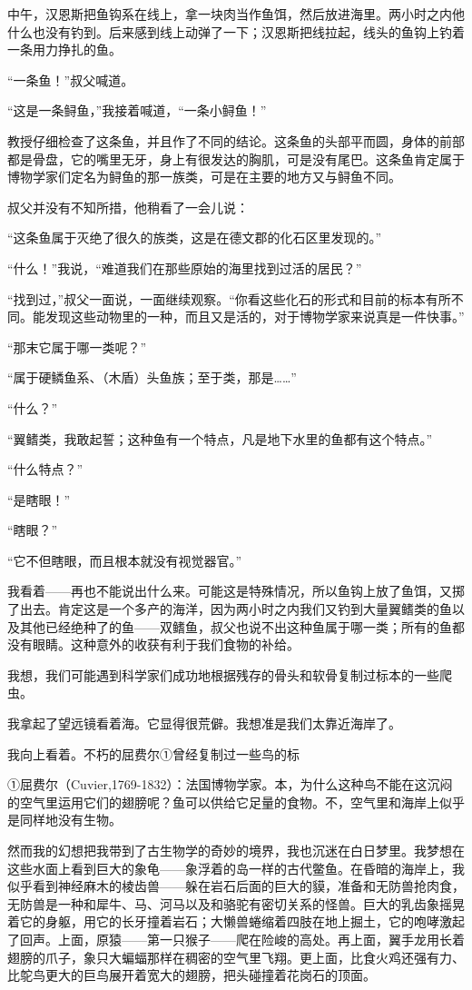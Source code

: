 \documentclass[10pt]{book}
\begin{document}
中午，汉恩斯把鱼钩系在线上，拿一块肉当作鱼饵，然后放进海里。两小时之内他什么也没有钓到。后来感到线上动弹了一下；汉恩斯把线拉起，线头的鱼钩上钓着一条用力挣扎的鱼。

“一条鱼！”叔父喊道。

“这是一条鲟鱼，”我接着喊道，“一条小鲟鱼！”

教授仔细检查了这条鱼，并且作了不同的结论。这条鱼的头部平而圆，身体的前部都是骨盘，它的嘴里无牙，身上有很发达的胸肌，可是没有尾巴。这条鱼肯定属于博物学家们定名为鲟鱼的那一族类，可是在主要的地方又与鲟鱼不同。

叔父并没有不知所措，他稍看了一会儿说：

“这条鱼属于灭绝了很久的族类，这是在德文郡的化石区里发现的。”

“什么！”我说，“难道我们在那些原始的海里找到过活的居民？”

“找到过，”叔父一面说，一面继续观察。“你看这些化石的形式和目前的标本有所不同。能发现这些动物里的一种，而且又是活的，对于博物学家来说真是一件快事。”

“那末它属于哪一类呢？”

“属于硬鳞鱼系、（木盾）头鱼族；至于类，那是……”

“什么？”

“翼鳍类，我敢起誓；这种鱼有一个特点，凡是地下水里的鱼都有这个特点。”

“什么特点？”

“是瞎眼！”

“瞎眼？”

“它不但瞎眼，而且根本就没有视觉器官。”

我看着——再也不能说出什么来。可能这是特殊情况，所以鱼钩上放了鱼饵，又掷了出去。肯定这是一个多产的海洋，因为两小时之内我们又钓到大量翼鳍类的鱼以及其他已经绝种了的鱼——双鳍鱼，叔父也说不出这种鱼属于哪一类；所有的鱼都没有眼睛。这种意外的收获有利于我们食物的补给。

我想，我们可能遇到科学家们成功地根据残存的骨头和软骨复制过标本的一些爬虫。

我拿起了望远镜看着海。它显得很荒僻。我想准是我们太靠近海岸了。

我向上看着。不朽的屈费尔①曾经复制过一些鸟的标

①屈费尔（Cuvier,1769-1832）：法国博物学家。本，为什么这种鸟不能在这沉闷的空气里运用它们的翅膀呢？鱼可以供给它足量的食物。不，空气里和海岸上似乎是同样地没有生物。

然而我的幻想把我带到了古生物学的奇妙的境界，我也沉迷在白日梦里。我梦想在这些水面上看到巨大的象龟——象浮着的岛一样的古代鳖鱼。在昏暗的海岸上，我似乎看到神经麻木的棱齿兽——躲在岩石后面的巨大的貘，准备和无防兽抢肉食，无防兽是一种和犀牛、马、河马以及和骆驼有密切关系的怪兽。巨大的乳齿象摇晃着它的身躯，用它的长牙撞着岩石；大懒兽蜷缩着四肢在地上掘土，它的咆哮激起了回声。上面，原猿——第一只猴子——爬在险峻的高处。再上面，翼手龙用长着翅膀的爪子，象只大蝙蝠那样在稠密的空气里飞翔。更上面，比食火鸡还强有力、比鸵鸟更大的巨鸟展开着宽大的翅膀，把头碰撞着花岗石的顶面。
\end{document}
